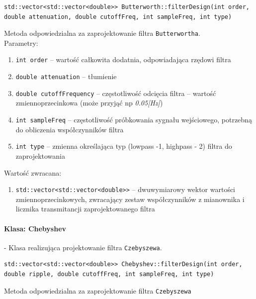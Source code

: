 \documentclass[a4paper, 11pt]{article}
\begin{document}
\begin{lstlisting}
std::vector<std::vector<double>> Butterworth::filterDesign(int order, 
double attenuation, double cutoffFreq, int sampleFreq, int type)
\end{lstlisting}
Metoda odpowiedzialna za zaprojektowanie filtra \verb|Butterwortha|.\\

Parametry:
\begin{enumerate}
\item \verb|int order|  -- wartość całkowita dodatnia, odpowiadająca rzędowi filtra
\item \verb|double attenuation|  -- tłumienie 
\item \verb|double cutoffFrequency|  -- częstotliwość odcięcia filtra  -- wartość zmiennoprzecinkowa (może przyjąć np \textit{0.05[Hz]})
\item \verb|int sampleFreq|  -- częstotliwość próbkowania sygnału wejściowego, potrzebną do obliczenia współczynników filtra
\item \verb|int type|  -- zmienna określająca typ (lowpass -1, highpass - 2) filtra do zaprojektowania
\end{enumerate}
Wartość zwracana:
\begin{enumerate}
\item \verb|std::vector<std::vector<double>>|  -- dwuwymiarowy wektor wartości zmiennoprzecinkowych, zwracający zestaw współczynników z mianownika i licznika transmitancji zaprojektowanego filtra
\end{enumerate}

\paragraph{Klasa: Chebyshev}
- Klasa realizująca projektowanie filtra \verb|Czebyszewa|.\\

\begin{lstlisting}
std::vector<std::vector<double>> Chebyshev::filterDesign(int order, 
double ripple, double cutoffFreq, int sampleFreq, int type)
\end{lstlisting}
Metoda odpowiedzialna za zaprojektowanie filtra \verb|Czebyszewa|\\
\end{document}
